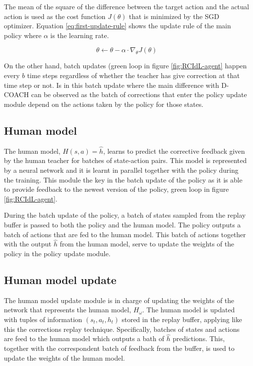 The mean of the square of the difference between the target action and the actual action is used as the cost function $J(\theta)$ that is minimized by the SGD optimizer. Equation \ref{eq:first-update-rule} shows the update rule of the main policy where $\alpha$ is the learning rate.


\begin{equation}
\theta \leftarrow \theta - \alpha \cdot \nabla_\theta J(\theta)
\label{eq:first-update-rule}
\end{equation}

On the other hand, batch updates (green loop in figure \ref{fig:RCIdL-agent} happen every $b$ time steps regardless of whether the teacher has give correction at that time step or not. Is in this batch update where the main difference with D-COACH can be observed as the batch of corrections that enter the policy update module depend on the actions taken by the policy for those states.




\subsection*{Human model}
The human model, $H(s, a) = \hat{h}$, learns to predict the corrective feedback given by the human teacher for batches of state-action pairs. This model is represented by a neural network and it is learnt in parallel together with the policy during the training. This module the key in the batch update of the policy as it is able to provide feedback to the newest version of the policy, green loop in figure \ref{fig:RCIdL-agent}.

During the batch update of the policy, a batch of states sampled from the replay buffer is passed to both the policy and the human model. The policy outputs a batch of actions that are fed to the human model. This batch of actions together with the output $\hat{h}$ from the human model, serve to update the weights of the policy in the policy update module. 



\subsection*{Human model update}

The human model update module is in charge of updating the weights of the network that represents the human model, $H_\omega$. The human model is updated with tuples of information $(s_t, a_t, h_t)$ stored in the replay buffer, applying like this the corrections replay technique. Specifically, batches of states and actions are feed to the human model which outputs a bath of $\hat{h}$ predictions. This, together with the correspondent batch of feedback from the buffer, is used to update the weights of the human model.

